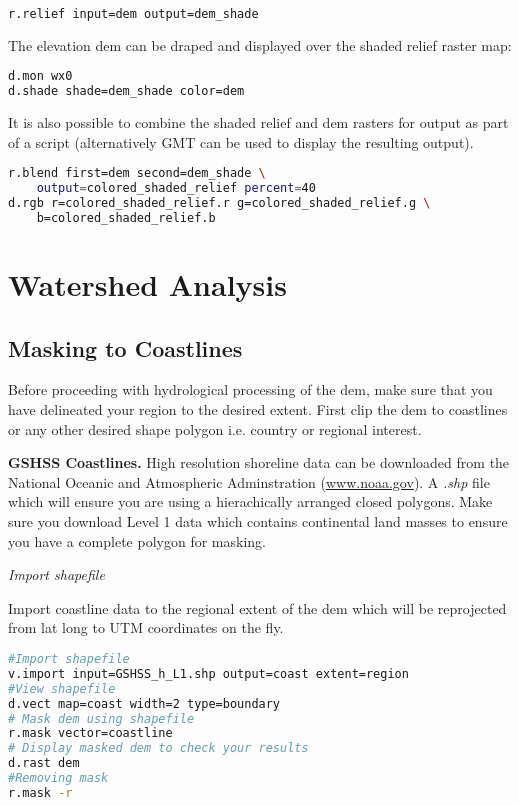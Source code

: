 \begin{lstlisting}[language=bash]
r.relief input=dem output=dem_shade
\end{lstlisting}

\noindent The elevation dem can be draped and displayed over the shaded relief raster map:

\begin{lstlisting}[language=bash]
d.mon wx0
d.shade shade=dem_shade color=dem
\end{lstlisting}

\noindent It is also possible to combine the shaded relief and dem rasters for output as part of a script (alternatively GMT can be used to display the resulting output). 

\begin{lstlisting}[language=bash]
r.blend first=dem second=dem_shade \ 
	output=colored_shaded_relief percent=40
d.rgb r=colored_shaded_relief.r g=colored_shaded_relief.g \
	b=colored_shaded_relief.b
\end{lstlisting}

\section{Watershed Analysis}

\subsection{Masking to Coastlines}

Before proceeding with hydrological processing of the dem, make sure that you have delineated your region to the desired extent. First clip the dem to coastlines or any other desired shape polygon i.e. country or regional interest. 

\noindent \textbf{GSHSS Coastlines.} High resolution shoreline data can be downloaded from the National Oceanic and Atmospheric Adminstration (\url{www.noaa.gov}). A \textit{.shp} file which will ensure you are using a hierachically arranged closed polygons. Make sure you download Level 1 data which contains continental land masses to ensure you have a complete polygon for masking.

\noindent \textit{Import shapefile}

\noindent Import coastline data to the regional extent of the dem which will be reprojected from lat long to UTM coordinates on the fly.

\begin{lstlisting}[language=bash]
#Import shapefile
v.import input=GSHSS_h_L1.shp output=coast extent=region
#View shapefile 
d.vect map=coast width=2 type=boundary
# Mask dem using shapefile
r.mask vector=coastline
# Display masked dem to check your results 
d.rast dem
#Removing mask
r.mask -r
\end{lstlisting}


